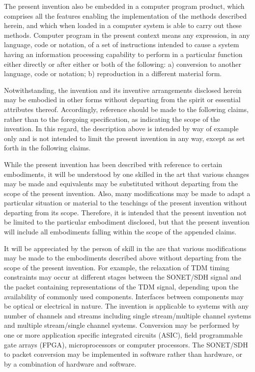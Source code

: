 \documentclass[letterpaper,final,notitlepage,twocolumn,10pt,twoside]{article}
\begin{document}
The present invention also be embedded in a computer program product, which
comprises all the features enabling the implementation of the methods
described herein, and which when loaded in a computer system is able to carry
out these methods.  Computer program in the present context means any
expression, in any language, code or notation, of a set of instructions
intended to cause a system having an information processing capability to
perform in a particular function either directly or after either or both of
the following: a) conversion to another language, code or notation; b)
reproduction in a different material form.

Notwithstanding, the invention and its inventive arrangements disclosed herein
may be embodied in other forms without departing from the spirit or essential
attributes thereof.  Accordingly, reference should be made to the following
claims, rather than to the foregoing specification, as indicating the scope of
the invention.  In this regard, the description above is intended by way of
example only and is not intended to limit the present invention in any way,
except as set forth in the following claims.

While the present invention has been described with reference to certain
embodiments, it will be understood by one skilled in the art that various
changes may be made and equivalents may be substituted without departing from
the scope of the present invention.  Also, many modifications may be made to
adapt a particular situation or material to the teachings of the present
invention without departing from its scope.  Therefore, it is intended that
the present invention not be limited to the particular embodiment disclosed,
but that the present invention will include all embodiments falling within the
scope of the appended claims.

It will be appreciated by the person of skill in the are that various
modifications may be made to the embodiments described above without departing
from the scope of the present invention.  For example, the relaxation of TDM
timing constraints may occur at different stages between the SONET/SDH signal
and the packet containing representations of the TDM signal, depending upon
the availability of commonly used components.  Interfaces between components
may be optical or electrical in nature.  The invention is applicable to
systems with any number of channels and streams including single
stream/multiple channel systems and multiple stream/single channel systems.
Conversion may be performed by one or more application specific integrated
circuits (ASIC), field programmable gate arrays (FPGA), microprocessors or
computer processors.  The SONET/SDH to packet conversion may be implemented in
software rather than hardware, or by a combination of hardware and software.
\end{document}
